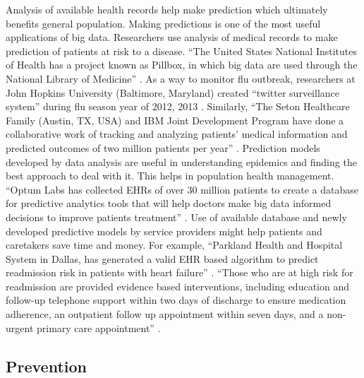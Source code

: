 \documentclass[sigconf]{acmart}
\begin{document}
Analysis of available health records help make prediction which ultimately benefits 
general population. Making predictions is one of 
the most useful applications of big data. Researchers use analysis of medical records to make prediction of patients at risk to 
a disease. ``The United States National Institutes of Health has a project known as Pillbox, in which big data are used through 
the National Library of Medicine'' \cite{www-tandf-com}. As a way to monitor flu outbreak, researchers at John Hopkins University (Baltimore, Maryland) created ``twitter surveillance system'' during flu season year of 2012, 2013  \cite{www-ncbi-nlm-nih-gov}.
Similarly, ``The Seton Healthcare Family (Austin, TX, USA) and IBM Joint Development Program have done a collaborative work of tracking and analyzing patients' medical information and predicted outcomes of two million patients per
year'' \cite{www-uhcjsc-com}. Prediction models developed by data analysis are useful in understanding epidemics and finding the best approach to deal 
with it. This helps in population health management. ``Optum Labs has collected EHRs of over 30 million patients to create a database 
for predictive analytics tools that will help doctors make big 
data informed decisions to improve patients treatment'' \cite{www-mapr-com}. Use of available database and newly developed predictive models by service providers might help patients and caretakers save time and money. For example, ``Parkland Health and Hospital System 
in Dallas, has generated a valid EHR based algorithm to predict readmission risk in patients with heart failure'' \cite{www-google-com}.
``Those who are at  high risk for readmission are provided evidence based interventions, including education and follow-up telephone support within two days of discharge to ensure medication adherence, an outpatient follow up 
appointment within seven days, and a non-urgent primary care appointment'' \cite{www-google-com}.


\subsection{Prevention}
\end{document}
